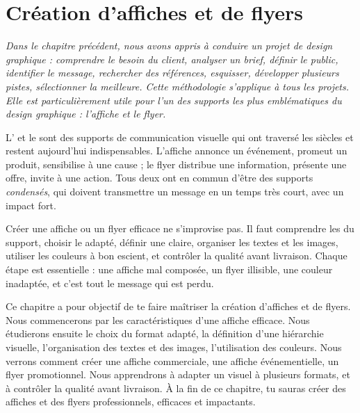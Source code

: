 
\chapter{Création d'affiches et de flyers}

\noindent
\textit{Dans le chapitre précédent, nous avons appris à conduire un projet de design graphique : comprendre le besoin du client, analyser un brief, définir le public, identifier le message, rechercher des références, esquisser, développer plusieurs pistes, sélectionner la meilleure. Cette méthodologie s'applique à tous les projets. Elle est particulièrement utile pour l'un des supports les plus emblématiques du design graphique : l'affiche et le flyer.}

\vspace{1em}

\noindent
L' et le  sont des supports de communication visuelle qui ont traversé les siècles et restent aujourd'hui indispensables. L'affiche annonce un événement, promeut un produit, sensibilise à une cause ; le flyer distribue une information, présente une offre, invite à une action. Tous deux ont en commun d'être des supports \emph{condensés}, qui doivent transmettre un message en un temps très court, avec un impact fort.

\vspace{1em}

\noindent
Créer une affiche ou un flyer efficace ne s'improvise pas. Il faut comprendre les  du support, choisir le  adapté, définir une  claire, organiser les textes et les images, utiliser les couleurs à bon escient, et contrôler la qualité avant livraison. Chaque étape est essentielle : une affiche mal composée, un flyer illisible, une couleur inadaptée, et c'est tout le message qui est perdu.

\vspace{1em}

\noindent
Ce chapitre a pour objectif de te faire maîtriser la création d'affiches et de flyers. Nous commencerons par les caractéristiques d'une affiche efficace. Nous étudierons ensuite le choix du format adapté, la définition d'une hiérarchie visuelle, l'organisation des textes et des images, l'utilisation des couleurs. Nous verrons comment créer une affiche commerciale, une affiche événementielle, un flyer promotionnel. Nous apprendrons à adapter un visuel à plusieurs formats, et à contrôler la qualité avant livraison. À la fin de ce chapitre, tu sauras créer des affiches et des flyers professionnels, efficaces et impactants.

